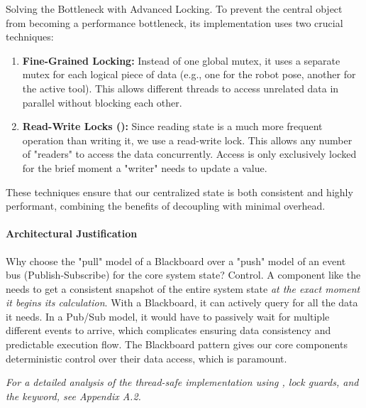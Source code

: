 \begin{tipbox}{Solving the Bottleneck with Advanced Locking.}
    To prevent the central  object from becoming a performance bottleneck, its implementation uses two crucial techniques:
    \begin{enumerate}
        \item \textbf{Fine-Grained Locking:} Instead of one global mutex, it uses a separate mutex for each logical piece of data (e.g., one for the robot pose, another for the active tool). This allows different threads to access unrelated data in parallel without blocking each other.
        \item \textbf{Read-Write Locks ():} Since reading state is a much more frequent operation than writing it, we use a read-write lock. This allows any number of "readers" to access the data concurrently. Access is only exclusively locked for the brief moment a "writer" needs to update a value.
    \end{enumerate}
    These techniques ensure that our centralized state is both consistent and highly performant, combining the benefits of decoupling with minimal overhead.
\end{tipbox}

\paragraph{Architectural Justification}
Why choose the "pull" model of a Blackboard over a "push" model of an event bus (Publish-Subscribe) for the core system state? Control. A component like the  needs to get a consistent snapshot of the entire system state \textit{at the exact moment it begins its calculation}. With a Blackboard, it can actively query for all the data it needs. In a Pub/Sub model, it would have to passively wait for multiple different events to arrive, which complicates ensuring data consistency and predictable execution flow. The Blackboard pattern gives our core components deterministic control over their data access, which is paramount.

\textit{For a detailed analysis of the thread-safe implementation using , lock guards, and the  keyword, see Appendix A.2.}


